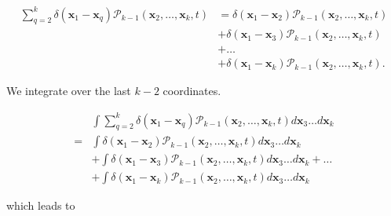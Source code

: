 \begin{subequations} 
\begin{align}
\sum_{q=2}^{k}\delta({\boldsymbol{x}_1-\boldsymbol{x}_q})\mathcal{P}_{k-1}(\boldsymbol{x}_{2},\ldots,\boldsymbol{x}_{k},t) & =\delta(\boldsymbol{x}_{1}-\boldsymbol{x}_{2})\mathcal{P}_{k-1}(\boldsymbol{x}_{2},\ldots,\boldsymbol{x}_{k},t)\\
 & +\delta(\boldsymbol{x}_{1}-\boldsymbol{x}_{3})\mathcal{P}_{k-1}(\boldsymbol{x}_{2},\ldots,\boldsymbol{x}_{k},t)\\
 & +\ldots\\
 & +\delta(\boldsymbol{x}_{1}-\boldsymbol{x}_{k})\mathcal{P}_{k-1}(\boldsymbol{x}_{2},\ldots,\boldsymbol{x}_{k},t).
\end{align}
\end{subequations}

\vspace{1.25em}

We integrate over the last $k-2$ coordinates.

\begin{subequations} 
\begin{flalign}
 & \int\sum_{q=2}^{k}\delta({\boldsymbol{x}_1-\boldsymbol{x}_q})\mathcal{P}_{k-1}(\boldsymbol{x}_{2},\ldots,\boldsymbol{x}_{k},t)d\boldsymbol{x}_{3}\ldots d\boldsymbol{x}_{k}\\
= & \int\delta(\boldsymbol{x}_{1}-\boldsymbol{x}_{2})\mathcal{P}_{k-1}(\boldsymbol{x}_{2},\ldots,\boldsymbol{x}_{k},t)d\boldsymbol{x}_{3}\ldots d\boldsymbol{x}_{k}\\
 & +\int\delta(\boldsymbol{x}_{1}-\boldsymbol{x}_{3})\mathcal{P}_{k-1}(\boldsymbol{x}_{2},\ldots,\boldsymbol{x}_{k},t)d\boldsymbol{x}_{3}\ldots d\boldsymbol{x}_{k}+\ldots\\
 & +\int\delta(\boldsymbol{x}_{1}-\boldsymbol{x}_{k})\mathcal{P}_{k-1}(\boldsymbol{x}_{2},\ldots,\boldsymbol{x}_{k},t)d\boldsymbol{x}_{3}\ldots d\boldsymbol{x}_{k}
\end{flalign}
\end{subequations}

which leads to


